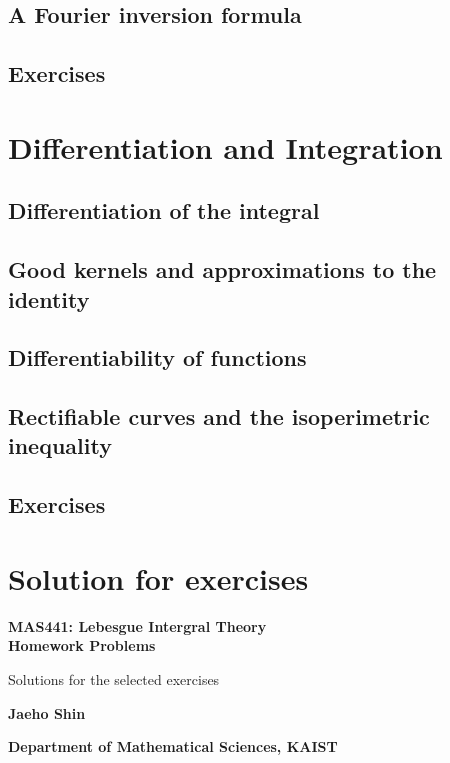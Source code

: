 \documentclass[12pt, a4paper, openany, twoside]{book}
\theoremstyle{definition}
\theoremstyle{remark}
\theoremstyle{plain}
\numberwithin{equation}{section}
\begin{document}
\section{A Fourier inversion formula}
\section{Exercises}

\chapter{Differentiation and Integration}
\section{Differentiation of the integral}
\section{Good kernels and approximations to the identity}
\section{Differentiability of functions}
\section{Rectifiable curves and the isoperimetric inequality}
\section{Exercises}

\chapter{Solution for exercises}
\begin{center}
    \vspace*{4cm}
        
    \Huge
    \textbf{MAS441: Lebesgue Intergral Theory\\\vspace{2mm}
    Homework Problems}

    \vspace{1cm}
    \large
    Solutions for the selected exercises
    \vspace{3cm}
    
    \LARGE
    \textbf{Jaeho Shin}
        
    \vspace{5cm}
        
    \normalsize
    \textbf{Department of Mathematical Sciences, KAIST}\\  
\end{center}
\newpage
\end{document}

